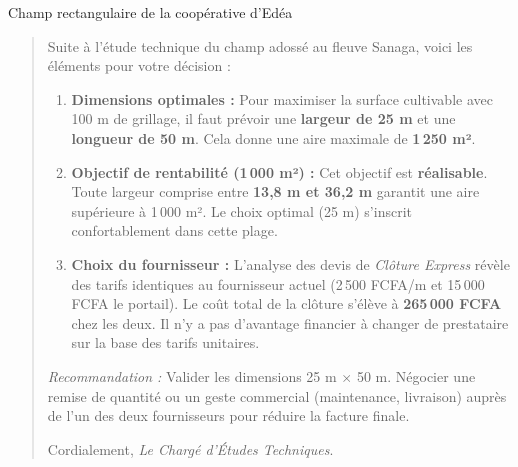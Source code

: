 \documentclass[11pt]{article}
\begin{document}
\begin{exoresolu}{Champ rectangulaire de la coopérative d'Edéa}
\begin{quote}
Suite à l'étude technique du champ adossé au fleuve Sanaga, voici les éléments pour votre décision :
\begin{enumerate}
    \item \textbf{Dimensions optimales :} Pour maximiser la surface cultivable avec 100 m de grillage, il faut prévoir une \textbf{largeur de 25 m} et une \textbf{longueur de 50 m}. Cela donne une aire maximale de \textbf{1\,250 m²}.
    \item \textbf{Objectif de rentabilité (1\,000 m²) :} Cet objectif est \textbf{réalisable}. Toute largeur comprise entre \textbf{13,8 m et 36,2 m} garantit une aire supérieure à 1\,000 m². Le choix optimal (25 m) s'inscrit confortablement dans cette plage.
    \item \textbf{Choix du fournisseur :} L'analyse des devis de \textit{Clôture Express} révèle des tarifs identiques au fournisseur actuel (2\,500 FCFA/m et 15\,000 FCFA le portail). Le coût total de la clôture s'élève à \textbf{265\,000 FCFA} chez les deux. Il n'y a pas d'avantage financier à changer de prestataire sur la base des tarifs unitaires.
\end{enumerate}
\emph{Recommandation :} Valider les dimensions 25 m $\times$ 50 m. Négocier une remise de quantité ou un geste commercial (maintenance, livraison) auprès de l'un des deux fournisseurs pour réduire la facture finale.

Cordialement, \textit{Le Chargé d'Études Techniques}.
\end{quote}
\end{exoresolu}
\end{document}
